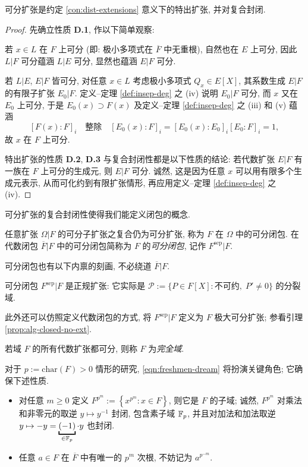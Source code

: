 \begin{proposition}\label{prop:sep-ext-dist}
	可分扩张是约定 \ref{con:dist-extensions} 意义下的特出扩张, 并对复合封闭.
\end{proposition}
\begin{proof}
	先确立性质 \textbf{D.1}, 作以下简单观察:
	\begin{compactitem}
		\item 若 $x \in L$ 在 $F$ 上可分 (即: 极小多项式在 $\overline{F}$ 中无重根), 自然也在 $E$ 上可分, 因此 $L|F$ 可分蕴涵 $L|E$ 可分, 显然也蕴涵 $E|F$ 可分.
		\item 若 $L|E$, $E|F$ 皆可分, 对任意 $x \in L$ 考虑极小多项式 $Q_x \in E[X]$, 其系数生成 $E|F$ 的有限子扩张 $E_0|F$. 定义--定理 \ref{def:insep-deg} 之 (iv) 说明 $E_0|F$ 可分, 而 $x$ 又在 $E_0$ 上可分, 于是 $E_0(x) \supset F(x)$ 及定义--定理 \ref{def:insep-deg} 之 (iii) 和 (v) 蕴涵
			\[ [F(x):F]_i \quad \text{整除} \quad [E_0(x):F]_i = [E_0(x):E_0]_i [E_0:F]_i = 1, \]
			故 $x$ 在 $F$ 上可分.
	\end{compactitem}
	特出扩张的性质 \textbf{D.2}, \textbf{D.3} 与复合封闭性都是以下性质的结论: 若代数扩张 $E|F$ 有一族在 $F$ 上可分的生成元, 则 $E|F$ 可分. 诚然, 这是因为任意 $x$ 可以用有限多个生成元表示, 从而可化约到有限扩张情形, 再应用定义--定理 \ref{def:insep-deg} 之 (iv).
\end{proof}

可分扩张的复合封闭性使得我们能定义闭包的概念.
\begin{definition}\label{def:sep-closure}
	任意扩张 $\Omega|F$ 的可分子扩张之复合仍为可分扩张, 称为 $F$ 在 $\Omega$ 中的可分闭包. 在代数闭包 $\overline{F}|F$ 中的可分闭包简称为 $F$ 的\emph{可分闭包}, 记作 $F^\mathrm{sep}|F$.
\end{definition}
可分闭包也有以下内禀的刻画, 不必绕道 $\overline{F}|F$.
\begin{proposition}
	可分闭包 $F^\mathrm{sep}|F$ 是正规扩张: 它实际是 $\mathcal{P} := \{P \in F[X]: \text{不可约},\; P' \neq 0 \}$ 的分裂域.
\end{proposition}
此外还可以仿照定义代数闭包的方式, 将 $F^\text{sep}|F$ 定义为 $F$ 极大可分扩张; 参看引理 \ref{prop:alg-closed-no-ext}.

\begin{definition}\label{def:perfect-field}
	若域 $F$ 的所有代数扩张都可分, 则称 $F$ 为\emph{完全域}.
\end{definition}

对于 $p := \text{char}(F) > 0$ 情形的研究, \eqref{eqn:freshmen-dream} 将扮演关键角色; 它确保下述性质.
\begin{itemize}
	\item 对任意 $m \geq 0$ 定义 $F^{p^m} := \left\{x^{p^m} : x \in F \right\}$, 则它是 $F$ 的子域; 诚然, $F^{p^m}$ 对乘法和非零元的取逆 $y \mapsto y^{-1}$ 封闭, 包含素子域 $\mathbb{F}_p$, 并且对加法和加法取逆 $y \mapsto -y = \underbracket{(-1)}_{\in \F_p} \cdot y$ 也封闭.
	\item 任意 $a \in F$ 在 $\overline{F}$ 中有唯一的 $p^m$ 次根, 不妨记为 $a^{p^{-m}}$.
\end{itemize}

